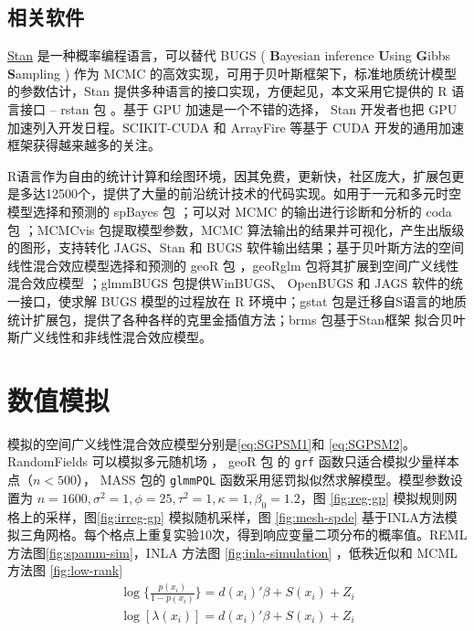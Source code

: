 \documentclass[hyperref, a4paper, UTF8, zihao = -4, linespread = 1.25, scheme = chinese]{ctexbook}
\begin{document}
\section{相关软件}

\href{http://mc-stan.org/}{Stan}
是一种概率编程语言\citep{Stan2017JSS}，可以替代 BUGS ( \textbf{B}ayesian
inference \textbf{U}sing \textbf{G}ibbs \textbf{S}ampling ) \citep{BUGS}
作为 MCMC
的高效实现，可用于贝叶斯框架下，标准地质统计模型的参数估计，Stan
提供多种语言的接口实现，方便起见，本文采用它提供的 R 语言接口 -- rstan
包 \citep{RStan}。基于 GPU 加速是一个不错的选择， Stan 开发者也把 GPU
加速列入开发日程。SCIKIT-CUDA \citep{scikitcuda2015} 和 ArrayFire
\citep{ArrayFire2015} 等基于 CUDA 开发的通用加速框架获得越来越多的关注。

R语言作为自由的统计计算和绘图环境，因其免费，更新快，社区庞大，扩展包更是多达12500个，提供了大量的前沿统计技术的代码实现。如用于一元和多元时空模型选择和预测的
spBayes 包 \citep{spBayes2015}；可以对 MCMC 的输出进行诊断和分析的 coda
包 \citep{coda2006}；MCMCvis 包提取模型参数，MCMC
算法输出的结果并可视化，产生出版级的图形，支持转化 JAGS、Stan 和 BUGS
软件输出结果\citep{R-MCMCvis}；基于贝叶斯方法的空间线性混合效应模型选择和预测的
geoR 包 \citep{geoR2001}，geoRglm 包将其扩展到空间广义线性混合效应模型
\citep{geoRglm2002}；glmmBUGS 包提供WinBUGS、 OpenBUGS 和 JAGS
软件的统一接口，使求解 BUGS 模型的过程放在 R
环境中\citep{R-glmmBUGS, glmmBUGS2010MCMC}；gstat
包是迁移自S语言的地质统计扩展包，提供了各种各样的克里金插值方法\citep{gstat2004, gstat2016}；brms
包基于Stan框架
拟合贝叶斯广义线性和非线性混合效应模型\citep{brms2017JSS}。

\hypertarget{simulations}{%
\chapter{数值模拟}\label{simulations}}

模拟的空间广义线性混合效应模型分别是\eqref{eq:SGPSM1}和
\eqref{eq:SGPSM2}。RandomFields 可以模拟多元随机场
\citep{RandomFields2015}， geoR 包\citep{R-geoR} 的 \texttt{grf}
函数只适合模拟少量样本点（\(n < 500\)）， MASS 包的 \texttt{glmmPQL}
函数采用惩罚拟似然求解模型\citep{MASS2002}。模型参数设置为
\(n=1600,\sigma^2=1,\phi=25,\tau^2=1,\kappa=1,\beta_0=1.2\)，图
\ref{fig:reg-gp} 模拟规则网格上的采样，图\ref{fig:irreg-gp}
模拟随机采样，图 \ref{fig:mesh-spde}
基于INLA方法模拟三角网格。每个格点上重复实验10次，得到响应变量二项分布的概率值。REML
方法图\ref{fig:spamm-sim}，INLA 方法图 \ref{fig:inla-simulation}
，低秩近似和 MCML 方法图 \ref{fig:low-rank}\begin{gather}
\log\big\{\frac{p(x_i)}{1-p(x_i)}\big\} = d(x_i)'\beta + S(x_i) + Z_i \label{eq:SGPSM1}\\
\log[\lambda(x_i)] = d(x_i)'\beta + S(x_i) + Z_i \label{eq:SGPSM2}
\end{gather}
\end{document}

